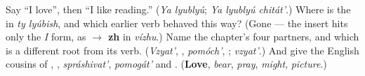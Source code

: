 \begin{tcolorbox}[breakable,colback=teal!4,colframe=teal!35!black,title={Before you move on}]
Say \textquotedblleft{}I love\textquotedblright{}, then \textquotedblleft{}I like reading.\textquotedblright{} (\emph{Ya lyublyú}; \emph{Ya lyublyú chitát'}.) Where is the \textbf{} in \emph{ty lyúbish}, and which earlier verb behaved this way? (Gone — the insert hits only the \emph{I} form, as \textbf{ $\to$ zh} in \emph{vízhu}.) Name the chapter's four partners, and which is a different root from its verb. (\emph{Vzyat'}, \textbf{}, \emph{pomóch'}, \textbf{}; \emph{vzyat'}.) And give the English cousins of \emph{}, \emph{}, \emph{spráshivat'}, \emph{pomogát'} and \emph{}. (\textbf{Love}, \emph{bear}, \emph{pray}, \emph{might}, \emph{picture}.)
\end{tcolorbox}
